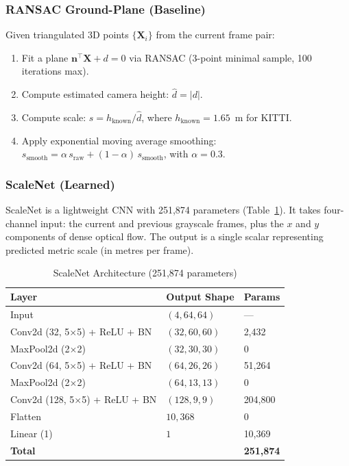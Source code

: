\documentclass[12pt,a4paper]{article}
\begin{document}
\subsubsection{RANSAC Ground-Plane (Baseline)}

Given triangulated 3D points $\{\mathbf{X}_i\}$ from the current frame pair:
\begin{enumerate}
    \item Fit a plane $\mathbf{n}^\top \mathbf{X} + d = 0$ via RANSAC (3-point minimal sample, 100 iterations max).
    \item Compute estimated camera height: $\hat{d} = |d|$.
    \item Compute scale: $s = h_{\text{known}} / \hat{d}$, where $h_{\text{known}} = 1.65$~m for KITTI.
    \item Apply exponential moving average smoothing: $s_{\text{smooth}} = \alpha\, s_{\text{raw}} + (1-\alpha)\, s_{\text{smooth}}$, with $\alpha = 0.3$.
\end{enumerate}

\subsubsection{ScaleNet (Learned)}

ScaleNet is a lightweight CNN with 251,874 parameters (Table~\ref{tab:scalenet_arch}). It takes four-channel input: the current and previous grayscale frames, plus the $x$ and $y$ components of dense optical flow. The output is a single scalar representing predicted metric scale (in metres per frame).

\begin{table}[h]
\centering
\caption{ScaleNet Architecture (251,874 parameters)}
\label{tab:scalenet_arch}
\begin{tabular}{lll}
\toprule
\textbf{Layer} & \textbf{Output Shape} & \textbf{Params} \\
\midrule
Input & $(4, 64, 64)$ & --- \\
Conv2d (32, 5$\times$5) + ReLU + BN & $(32, 60, 60)$ & 2,432 \\
MaxPool2d (2$\times$2) & $(32, 30, 30)$ & 0 \\
Conv2d (64, 5$\times$5) + ReLU + BN & $(64, 26, 26)$ & 51,264 \\
MaxPool2d (2$\times$2) & $(64, 13, 13)$ & 0 \\
Conv2d (128, 5$\times$5) + ReLU + BN & $(128, 9, 9)$ & 204,800 \\
Flatten & $10,368$ & 0 \\
Linear (1) & $1$ & 10,369 \\
\midrule
\textbf{Total} & & \textbf{251,874} \\
\bottomrule
\end{tabular}
\end{table}
\end{document}
